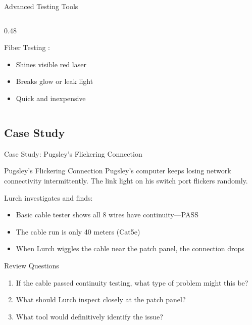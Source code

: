 \documentclass[aspectratio=169]{beamer}  %
\begin{document}
\begin{frame}{Advanced Testing Tools}
\begin{columns}[T]
\begin{column}{0.48\textwidth}
\begin{block}{Fiber Testing}
                \vspace{0.3em}
                :
                \begin{itemize}
                    \item Shines visible red laser
                    \item Breaks glow or leak light
                    \item Quick and inexpensive
                \end{itemize}
            \end{block}
        \end{column}
    \end{columns}
    
\end{frame}

\subsection{Case Study}

\begin{frame}{Case Study: Pugsley's Flickering Connection}
    \begin{casestudy}{Pugsley's Flickering Connection}
        Pugsley's computer keeps losing network connectivity intermittently. The link light on his switch port flickers randomly.
        
        \vspace{0.5em}
        Lurch investigates and finds:
        \begin{itemize}
            \item Basic cable tester shows all 8 wires have continuity---PASS
            \item The cable run is only 40 meters (Cat5e)
            \item When Lurch wiggles the cable near the patch panel, the connection drops
        \end{itemize}
    \end{casestudy}
    
    \begin{block}{Review Questions}
        \begin{enumerate}
            \item If the cable passed continuity testing, what type of problem might this be?
            \item What should Lurch inspect closely at the patch panel?
            \item What tool would definitively identify the issue?
        \end{enumerate}
    \end{block}
\end{frame}
\end{document}
